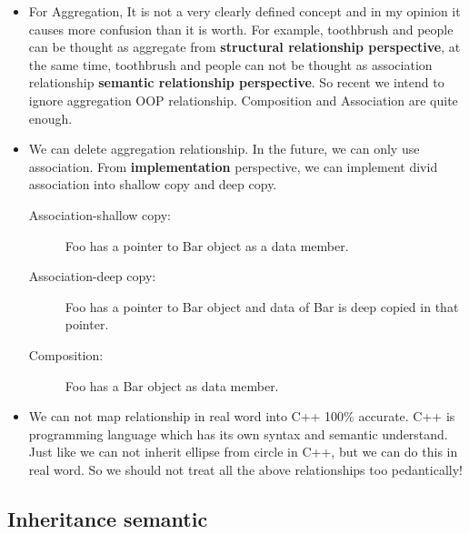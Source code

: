 \documentclass[a4paper,11pt,twoside]{book}
\begin{document}
\begin{itemize}
	\item For Aggregation, It is not a very clearly defined concept and in my opinion it causes more confusion than it is worth. For example, toothbrush and people can be thought as aggregate from \textbf{structural relationship perspective}, at the same time, toothbrush and people can not be thought as association relationship \textbf{semantic relationship perspective}. So recent we intend to ignore aggregation OOP relationship. Composition and Association are quite enough.  
	
	\item We can delete aggregation relationship. In the future, we can only use association. From \textbf{implementation} perspective,  we can implement divid association into shallow copy and deep copy. 
	
	\begin{description}

		\item[Association-shallow copy:] Foo has a pointer to Bar object as a data member.
		\item[Association-deep copy:] Foo has a pointer to Bar object and data of Bar is deep copied in that pointer.
		\item[Composition:] Foo has a Bar object as data member.
	\end{description}

	\item We can not map relationship in real word into C++ 100\% accurate. C++ is programming language which has its own syntax and semantic understand. Just like we can not inherit ellipse from circle in C++, but we can do this in real word. So we should not treat all the above relationships too pedantically!
	
\end{itemize}
	

\subsection{Inheritance semantic}
\end{document}
